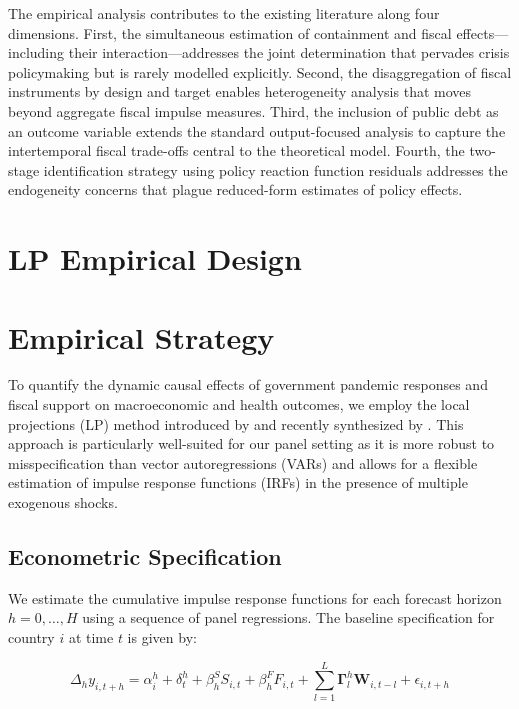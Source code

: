 \documentclass[12pt, a4paper]{article}
\begin{document}
The empirical analysis contributes to the existing literature along four dimensions. First, the simultaneous estimation of containment and fiscal effects---including their interaction---addresses the joint determination that pervades crisis policymaking but is rarely modelled explicitly. Second, the disaggregation of fiscal instruments by design and target enables heterogeneity analysis that moves beyond aggregate fiscal impulse measures. Third, the inclusion of public debt as an outcome variable extends the standard output-focused analysis to capture the intertemporal fiscal trade-offs central to the theoretical model. Fourth, the two-stage identification strategy using policy reaction function residuals addresses the endogeneity concerns that plague reduced-form estimates of policy effects.


\section{LP Empirical Design}
\section{Empirical Strategy}

To quantify the dynamic causal effects of government pandemic responses and fiscal support on macroeconomic and health outcomes, we employ the local projections (LP) method introduced by \cite{Jorda2005} and recently synthesized by \cite{JordaTaylor2025}. This approach is particularly well-suited for our panel setting as it is more robust to misspecification than vector autoregressions (VARs) and allows for a flexible estimation of impulse response functions (IRFs) in the presence of multiple exogenous shocks.

\subsection{Econometric Specification}

We estimate the cumulative impulse response functions for each forecast horizon $h = 0, \dots, H$ using a sequence of panel regressions. The baseline specification for country $i$ at time $t$ is given by:

\begin{equation} \label{eq:lp_baseline}
\Delta_h y_{i,t+h} = \alpha_i^h + \delta_t^h + \beta_h^S S_{i,t} + \beta_h^F F_{i,t} + \sum_{l=1}^{L} \mathbf{\Gamma}_l^h \mathbf{W}_{i,t-l} + \epsilon_{i,t+h}
\end{equation}
\end{document}
